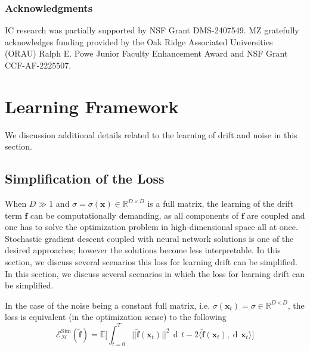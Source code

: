 \documentclass[11pt]{article} %
\def\rvx{{\mathbf{x}}}
\def\vf{{\bm{f}}}
\def\gH{{\mathcal{H}}}
\newcommand{\E}{\mathbb{E}}
\newcommand{\R}{\mathbb{R}}
\DeclareMathOperator{\dif}{d \!}        %
\newcommand{\dt}{\dif t}
\newcommand{\norm}[1]{||#1||}
\newcommand{\loss}{\mathcal{E}}
\begin{document}
\subsubsection*{Acknowledgments}
IC research was partially supported by NSF Grant DMS-2407549. MZ gratefully acknowledges funding provided by the Oak Ridge Associated Universities (ORAU) Ralph E. Powe Junior Faculty Enhancement Award and NSF Grant CCF-AF-$2225507$.  
%


%
\appendix
%
\section{Learning Framework}
%
We discussion additional details related to the learning of drift and noise in this section.
%
\subsection{Simplification of the Loss}
%
When $D \gg 1$ and $\sigma = \sigma(\rvx) \in \R^{D \times D}$ is a full matrix, the learning of the drift term $\vf$ can be computationally demanding, as all components of $\vf$ are coupled and one has to solve the optimization problem in high-dimensional space all at once.  Stochastic gradient descent coupled with neural network solutions is one of the desired approaches; however the solutions become less interpretable.  In this section, we discuss several scenarios this loss for learning drift can be simplified.  In this section, we discuss several scenarios in which the loss for learning drift can be simplified.

In the case of the noise being a constant full matrix, i.e. $\sigma(\rvx_t) = \sigma \in \R^{D\times D}$, the loss is equivalent (in the optimization sense) to the following 
\[
\loss_{\gH}^{\text{Sim}}(\tilde\vf) = \E\Big[\int_{t = 0}^T\norm{\tilde\vf(\rvx_t)}^2\,\dt - 2\langle\tilde\vf(\rvx_t), \dif \rvx_t\rangle\Big]
\]
\end{document}
